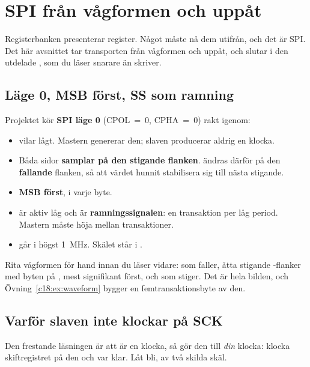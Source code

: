 
\section{SPI från vågformen och uppåt}
\label{c18:sec:spi}

Registerbanken presenterar register. Något måste nå dem utifrån, och det är SPI. Det här avsnittet
tar transporten från vågformen och uppåt, och slutar i den utdelade , som du läser
snarare än skriver.

\subsection*{Läge 0, MSB först, SS som ramning}
Projektet kör \textbf{SPI läge 0} (CPOL~=~0, CPHA~=~0) rakt igenom:
\begin{itemize}
  \item {} vilar lågt. Mastern genererar den; slaven producerar aldrig en klocka.
  \item Båda sidor \textbf{samplar på den stigande flanken}.  ändras därför på den
    \textbf{fallande} flanken, så att värdet hunnit stabilisera sig till nästa stigande.
  \item \textbf{MSB först}, i varje byte.
  \item {} är aktiv låg och är \textbf{ramningssignalen}: en transaktion per låg period.
    Mastern måste höja  mellan transaktioner.
  \item {} går i högst 1~MHz. Skälet står i .
\end{itemize}

Rita vågformen för hand innan du läser vidare:  som faller, åtta stigande -flanker
med byten  på , mest signifikant först, och  som stiger. Det är hela
bilden, och Övning~\ref{c18:ex:waveform} bygger en femtransaktionsbyte av den.

\subsection{Varför slaven inte klockar på SCK}
\label{c18:sub:oversample}

Den frestande läsningen är att  är en klocka, så gör den till \emph{din} klocka: klocka
skiftregistret på den och var klar. Låt bli, av två skilda skäl.

